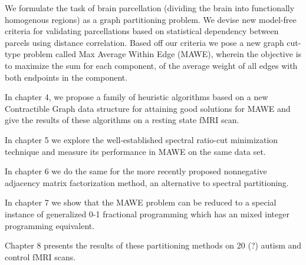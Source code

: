 We formulate the task of brain parcellation (dividing the
brain into functionally homogenous regions) as a graph
partitioning problem. We devise new model-free criteria
for validating parcellations based on statistical
dependency between parcels using distance correlation.
Based off our criteria we pose a new graph cut-type
problem called Max Average Within Edge (MAWE), wherein the
objective is to maximize the sum for each component, of
the average weight of all edges with both endpoints in the
component.

In chapter 4, we propose a family of heuristic algorithms
based on a new Contractible Graph data structure for
attaining good solutions for MAWE and give the results
of these algorithms on a resting state fMRI scan.

In chapter 5 we explore the well-established spectral
ratio-cut minimization technique and measure its
performance in MAWE on the same data set.

In chapter 6 we do the same for the more recently proposed
nonnegative adjacency matrix factorization method,
an alternative to spectral partitioning.

In chapter 7 we show that the MAWE problem can be
reduced to a special instance of generalized 0-1
fractional programming which has an mixed integer programming
equivalent.

Chapter 8 presents the results of these partitioning methods
on 20 (?) autism and control fMRI scans.
